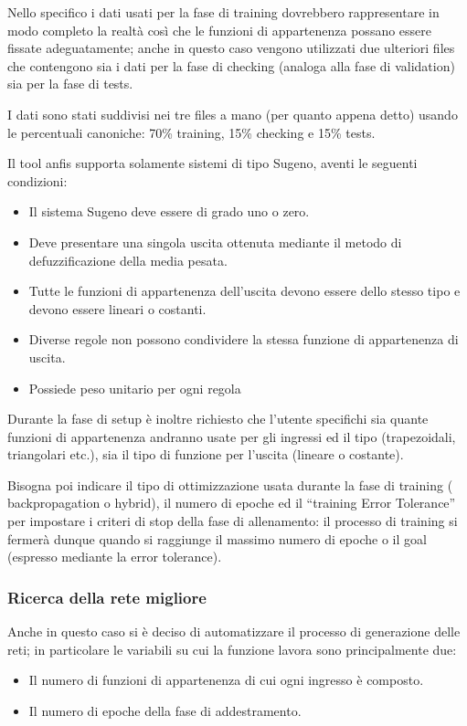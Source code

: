 Nello specifico i dati usati per la fase di training dovrebbero rappresentare in modo completo la realtà così che le funzioni di appartenenza possano essere fissate adeguatamente; anche in questo caso vengono utilizzati due ulteriori files che contengono sia i dati per la fase di checking (analoga alla fase di validation) sia per la fase di tests.

I dati sono stati suddivisi nei tre files a mano (per quanto appena detto) usando le percentuali canoniche: 70\% training, 15\% checking e 15\% tests.

Il tool anfis supporta solamente sistemi di tipo Sugeno, aventi le seguenti condizioni:

\begin{itemize}
  \item Il sistema Sugeno deve essere di grado uno o zero.
  \item Deve presentare una singola uscita ottenuta mediante il metodo di defuzzificazione della media pesata.
  \item Tutte le funzioni di appartenenza dell'uscita devono essere dello stesso tipo e devono essere lineari o costanti.
  \item Diverse regole non possono condividere la stessa funzione di appartenenza di uscita.
  \item Possiede peso unitario per ogni regola %
\end{itemize}

Durante la fase di setup è inoltre richiesto che l'utente specifichi sia quante funzioni di appartenenza andranno usate per gli ingressi ed il tipo (trapezoidali, triangolari etc.), sia il tipo di funzione per l'uscita (lineare o costante).

Bisogna poi indicare il tipo di ottimizzazione usata durante la fase di training ( backpropagation o hybrid), il numero di epoche ed il “training Error Tolerance” per impostare i criteri di stop della fase di allenamento: il processo di training si fermerà dunque quando si raggiunge il massimo numero di epoche o il goal (espresso mediante la error tolerance).


\subsubsection{Ricerca della rete migliore}

Anche in questo caso si è deciso di automatizzare il processo di generazione delle reti; in particolare le variabili su cui la funzione lavora sono principalmente due:
\begin{itemize}
  \item Il numero di funzioni di appartenenza di cui ogni ingresso è composto.
  \item Il numero di epoche della fase di addestramento.
\end{itemize}

